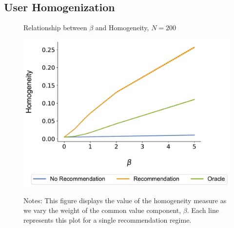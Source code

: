 \documentclass[format=acmsmall, review=false]{acmart}
\begin{document}
\subsection{User Homogenization}

\begin{figure}[ht]
\caption{Relationship between $\beta$ and Homogeneity, $N = 200$}
\includegraphics[width=.45\linewidth]{figures/beta_homogeneity_N_200_T_20}\label{fig:beta_homo}
\caption*{\scriptsize Notes: This figure displays the value of the homogeneity measure as we vary the weight of the common value component, $\beta$. Each line represents this plot for a single recommendation regime.}
\end{figure}
\end{document}
